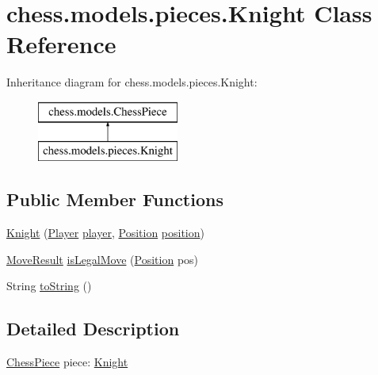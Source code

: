 \hypertarget{classchess_1_1models_1_1pieces_1_1_knight}{}\section{chess.\+models.\+pieces.\+Knight Class Reference}
\label{classchess_1_1models_1_1pieces_1_1_knight}
Inheritance diagram for chess.\+models.\+pieces.\+Knight\+:\begin{figure}[H]
\begin{center}
\leavevmode
\includegraphics[height=2.000000cm]{classchess_1_1models_1_1pieces_1_1_knight}
\end{center}
\end{figure}
\subsection*{Public Member Functions}
\begin{DoxyCompactItemize}
\item 
\mbox{\hyperlink{classchess_1_1models_1_1pieces_1_1_knight_aa435be794e37d426954f2853a4aac26a}{Knight}} (\mbox{\hyperlink{enumchess_1_1models_1_1enums_1_1_player}{Player}} \mbox{\hyperlink{classchess_1_1models_1_1_chess_piece_a3bcc8a24667318b5aab8c146adcc3eb7}{player}}, \mbox{\hyperlink{classchess_1_1models_1_1_position}{Position}} \mbox{\hyperlink{classchess_1_1models_1_1_chess_piece_a0e4f8616b75e548f269d3971846396f3}{position}})
\item 
\mbox{\hyperlink{enumchess_1_1models_1_1enums_1_1_move_result}{Move\+Result}} \mbox{\hyperlink{classchess_1_1models_1_1pieces_1_1_knight_af1018a686f81f9627d2851c919280448}{is\+Legal\+Move}} (\mbox{\hyperlink{classchess_1_1models_1_1_position}{Position}} pos)
\item 
String \mbox{\hyperlink{classchess_1_1models_1_1pieces_1_1_knight_a18c83fa9040a0035d86c3354f3ada4ea}{to\+String}} ()
\end{DoxyCompactItemize}


\subsection{Detailed Description}
\mbox{\hyperlink{classchess_1_1models_1_1_chess_piece}{Chess\+Piece}} piece\+: \mbox{\hyperlink{classchess_1_1models_1_1pieces_1_1_knight}{Knight}} 

